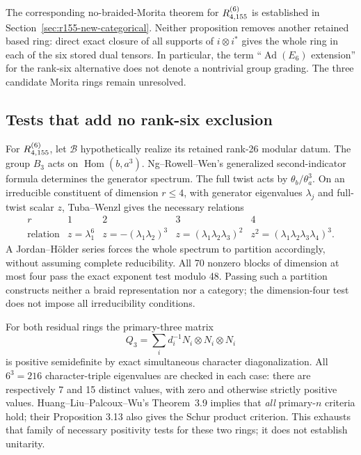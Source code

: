 The corresponding no-braided-Morita theorem for $R^{(6)}_{4,155}$ is established in Section~\ref{sec:r155-new-categorical}. Neither proposition removes another retained based ring: direct exact closure of all supports of $i\otimes i^*$ gives the whole ring in each of the six stored dual tensors. In particular, the term ``$\operatorname{Ad}(E_6)$ extension'' for the rank-six alternative does not denote a nontrivial group grading. The three candidate Morita rings remain unresolved.

\subsection{Tests that add no rank-six exclusion}
For $R^{(6)}_{4,155}$, let $\mathcal B$ hypothetically realize its retained rank-26 modular datum. The group $B_3$ acts on $\operatorname{Hom}(b,a^3)$. Ng--Rowell--Wen's generalized second-indicator formula \cite[Theorem~3.1]{NRW} determines the generator spectrum. The full twist acts by $\theta_b/\theta_a^3$. On an irreducible constituent of dimension $r\le4$, with generator eigenvalues $\lambda_j$ and full-twist scalar $z$, Tuba--Wenzl \cite[Propositions~2.5--2.6 and Theorem~2.9]{TW} gives the necessary relations
\[
 \begin{array}{c|cccc}
 r&1&2&3&4\\ \hline
 \text{relation}&z=\lambda_1^6&z=-(\lambda_1\lambda_2)^3&
 z=(\lambda_1\lambda_2\lambda_3)^2&z^2=(\lambda_1\lambda_2\lambda_3\lambda_4)^3.
 \end{array}
\]
A Jordan--H\"older series forces the whole spectrum to partition accordingly, without assuming complete reducibility. All 70 nonzero blocks of dimension at most four pass the exact exponent test modulo 48. Passing such a partition constructs neither a braid representation nor a category; the dimension-four test does not impose all irreducibility conditions.

For both residual rings the primary-three matrix
\[
 Q_3=\sum_i d_i^{-1}N_i\otimes N_i\otimes N_i
\]
is positive semidefinite by exact simultaneous character diagonalization. All $6^3=216$ character-triple eigenvalues are checked in each case: there are respectively 7 and 15 distinct values, with zero and otherwise strictly positive values. Huang--Liu--Palcoux--Wu's Theorem~3.9 \cite{HLPW} implies that \emph{all} primary-$n$ criteria hold; their Proposition 3.13 also gives the Schur product criterion. This exhausts that family of necessary positivity tests for these two rings; it does not establish unitarity.

